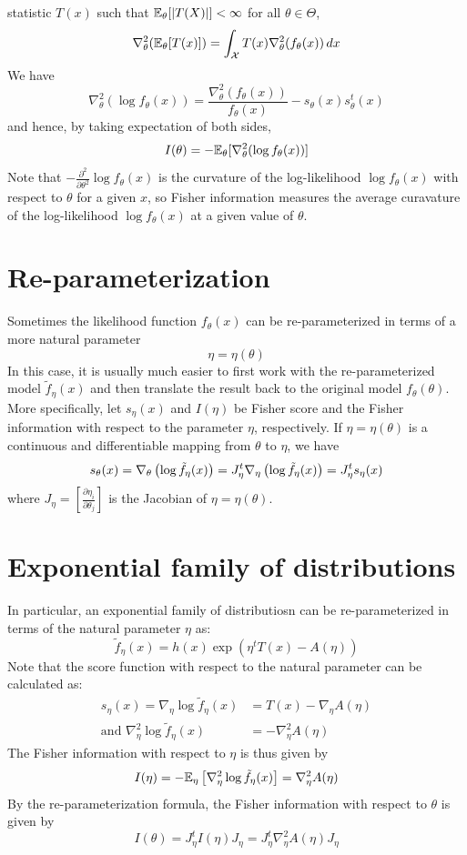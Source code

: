 \documentclass[11pt]{book}
\begin{document}
statistic $T(x)$ such that $\mathbb{E}_\theta[|T(X)|] < \infty$ for all $\theta \in \Theta$,
\[
  \nabla_\theta^2 (\mathbb{E}_\theta[T(x)]) = \int_{\mathcal{X}} T(x) \nabla_\theta^2 (f_\theta(x)) \, dx
\]
We have 
\[
  \nabla_\theta^2 (\log f_\theta(x)) = \frac{\nabla_\theta^2 (f_\theta(x))}{f_\theta(x)} - s_\theta(x) s_\theta^t(x)
\]
and hence, by taking expectation of both sides, 
\[
  I(\theta) = -\mathbb{E}_\theta[\nabla_\theta^2 (\log f_\theta(x))]
\]
Note that $-\frac{\partial^2}{\partial \theta^2} \log f_\theta(x)$ is the curvature of the log-likelihood $\log f_\theta(x)$ with respect to $\theta$ for a given $x$, so Fisher information measures the average curavature of the log-likelihood $\log f_\theta(x)$ at a given value of $\theta$.
\section{Re-parameterization}
Sometimes the likelihood function $f_\theta(x)$ can be re-parameterized in terms of a more natural parameter 
\[ 
  \eta = \eta(\theta)
\] 
In this case, it is usually much easier to first work with the re-parameterized model $\tilde{f}_\eta (x)$ and then translate the result back to the original model $f_\theta(\theta)$. \\ 

\noindent More specifically, let $s_\eta (x)$ and $I(\eta)$ be Fisher score and the Fisher information with respect to the parameter $\eta$, respectively. If $\eta = \eta(\theta)$ is a continuous and differentiable mapping from 
$\theta$ to $\eta$, we have 
\[
  s_\theta(x) = \nabla_\theta \left( \log \tilde{f}_\eta(x) \right) = J_\eta^t \nabla_\eta \left( \log \tilde{f}_\eta (x) \right) = J_\eta^t s_\eta(x)
\]
where $J_\eta = \left[ \frac{\partial \eta_i}{\partial \theta_j}\right]$ is the Jacobian of $\eta = \eta(\theta)$. 

\section{Exponential family of distributions}
In particular, an exponential family of distributiosn can be re-parameterized in terms of the natural parameter $\eta$ as: 
\[
  \tilde{f}_\eta(x) = h(x) \exp (\eta^t T(x) - A(\eta))
\] 
Note that the score function with respect to the natural parameter can be calculated as: 
\begin{align*}
  s_\eta(x) = \nabla_\eta \log \tilde{f}_\eta(x) &= T(x) - \nabla_\eta A(\eta) \\ 
  \text{and  } \nabla_\eta^2 \log \tilde{f}_\eta(x) &= -\nabla_\eta^2 A(\eta)
\end{align*}
The Fisher information with respect to $\eta$ is thus given by 
\[
  I(\eta) = -\mathbb{E}_\eta \left[ \nabla_\eta^2 \log \tilde{f}_\eta (x)\right] = \nabla_\eta^2 A(\eta)
  \] 
 By the re-parameterization formula, the Fisher information with respect to $\theta$ is given by 
 \[ 
   I(\theta) = J_\eta^t I(\eta) J_\eta = J_\eta^t \nabla_\eta^2 A(\eta) J_\eta 
 \] 
\end{document}
